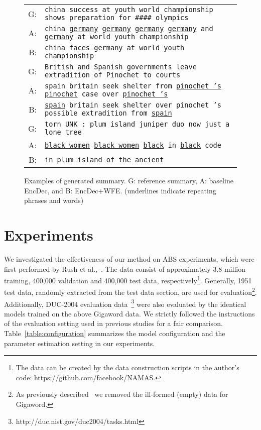 \documentclass[11pt]{article}
\begin{document}
\begin{figure}[t]
 \centering
 \tabcolsep=1pt
 \small
 \begin{tabular}{rp{71mm}}
  \hline
  G: & {\tt china success at youth world championship shows preparation for \#\#\#\# olympics}\\
  A: & {\tt china \underline{germany} \underline{germany} \underline{germany} \underline{germany} and \underline{germany} at world youth championship}\\
  B: & {\tt china faces germany at world youth championship}\\
  \hline
  G:& {\tt British and Spanish governments leave extradition of Pinochet to courts}\\
  A:& {\tt spain britain seek shelter from \underline{pinochet 's} \underline{pinochet} case over \underline{pinochet 's}}\\
  B:& {\tt \underline{spain} britain seek shelter over pinochet 's possible extradition from \underline{spain}}\\
  \hline
  G:& {\tt torn UNK : plum island juniper duo now just a lone tree}\\
  A:& {\tt \underline{black women} \underline{black women} \underline{black} in \underline{black} code}\\
  B:& {\tt in plum island of the ancient}\\
  \hline
 \end{tabular}
 \caption{Examples of generated summary. G: reference summary, A: baseline EncDec, and B: EncDec+WFE. (underlines indicate repeating phrases and words)}
 \label{fig:raw_generation}
\end{figure}
\section{Experiments}
\label{sec:experiments}
We investigated the effectiveness of our method on ABS experiments, which were first performed by Rush et al.,~.
The data consist of approximately 3.8 million training, 400,000 validation and 400,000 test data, respectively\footnote{The data can be created by the data construction scripts in the author's code: {{https://github.com/facebook/NAMAS}}.}.
Generally, 1951 test data, randomly extracted from the test data section, are used for evaluation\footnote{As previously described~\cite{chopra-auli-rush:2016:N16-1} we removed the ill-formed (empty) data for Gigaword.}.
Additionally, DUC-2004 evaluation data~\cite{Over:2007:DC:1284916.1285157}\footnote{http://duc.nist.gov/duc2004/tasks.html} were also evaluated by the identical models trained on the above Gigaword data. 
We strictly followed the instructions of the evaluation setting used in previous studies for a fair comparison.
Table~\ref{table:configuration} summarizes the model configuration and the parameter estimation setting in our experiments.
\end{document}
